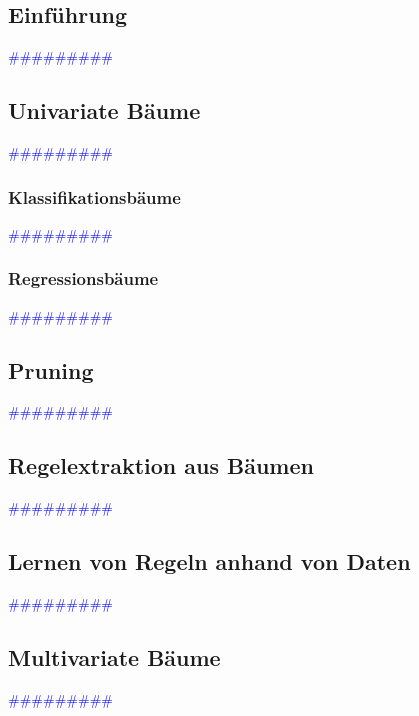 \documentclass{article}
\begin{document}
  \subsection{Einführung} %
      \textcolor{blue}{\#\#\#\#\#\#\#\#\#}
  \subsection{Univariate Bäume} %
      \textcolor{blue}{\#\#\#\#\#\#\#\#\#}
    \subsubsection{Klassifikationsbäume} %
      \textcolor{blue}{\#\#\#\#\#\#\#\#\#}
    \subsubsection{Regressionsbäume} %
      \textcolor{blue}{\#\#\#\#\#\#\#\#\#}
  \subsection{Pruning} %
      \textcolor{blue}{\#\#\#\#\#\#\#\#\#}
  \subsection{Regelextraktion aus Bäumen} %
      \textcolor{blue}{\#\#\#\#\#\#\#\#\#}
  \subsection{Lernen von Regeln anhand von Daten} %
      \textcolor{blue}{\#\#\#\#\#\#\#\#\#}
  \subsection{Multivariate Bäume} %
      \textcolor{blue}{\#\#\#\#\#\#\#\#\#}
\end{document}
